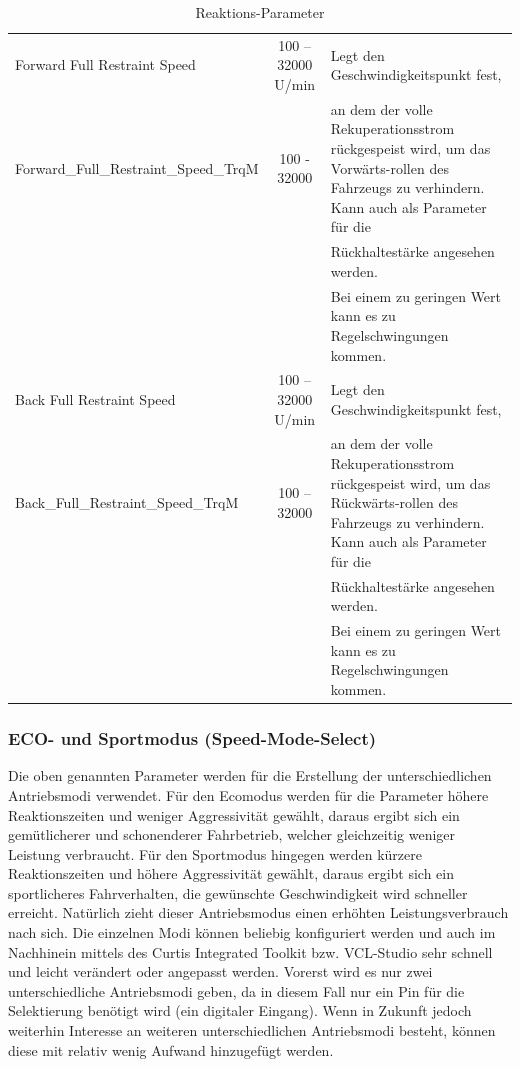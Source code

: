 \begin{table}[H]
\begin{tabular}{|lcp{6cm}|}
		Forward Full Restraint Speed & 100 – 32000 U/min & Legt den Geschwindigkeitspunkt fest,\\   Forward\_Full\_Restraint\_Speed\_TrqM & 100 - 32000 & an dem der volle Rekuperationsstrom rückgespeist wird, um das Vorwärts-rollen des Fahrzeugs zu verhindern. Kann auch als Parameter für die              \\&&Rückhaltestärke angesehen werden.\\&& Bei einem zu geringen Wert kann es zu Regelschwingungen kommen.  \\\hline
		Back Full Restraint Speed & 100 – 32000 U/min & Legt den Geschwindigkeitspunkt fest,\\ 		Back\_Full\_Restraint\_Speed\_TrqM & 100 – 32000 & an dem der volle Rekuperationsstrom rückgespeist wird, um das Rückwärts-rollen des Fahrzeugs zu verhindern. Kann auch als Parameter für die 				\\&&Rückhaltestärke angesehen werden.\\&& Bei einem zu geringen Wert kann es zu Regelschwingungen kommen. \\\hline		
	\end{tabular}	
	\caption{Reaktions-Parameter}
	\label{tab:Reaktions-Parameter}
\end{table}


\newpage

\subsubsection{ECO- und Sportmodus (Speed-Mode-Select)}
Die oben genannten Parameter werden für die Erstellung der unterschiedlichen Antriebsmodi verwendet. Für den Ecomodus werden für die Parameter höhere Reaktionszeiten und weniger Aggressivität gewählt, daraus ergibt sich ein gemütlicherer und schonenderer Fahrbetrieb, welcher gleichzeitig weniger Leistung verbraucht. Für den Sportmodus hingegen werden kürzere Reaktionszeiten und höhere Aggressivität gewählt, daraus ergibt sich ein sportlicheres Fahrverhalten, die gewünschte Geschwindigkeit wird schneller erreicht. Natürlich zieht dieser Antriebsmodus einen erhöhten Leistungsverbrauch nach sich. Die einzelnen Modi können beliebig konfiguriert werden und auch im Nachhinein mittels des Curtis Integrated Toolkit bzw. VCL-Studio sehr schnell und leicht verändert oder angepasst werden. Vorerst wird es nur zwei unterschiedliche Antriebsmodi geben, da in diesem Fall nur ein Pin für die Selektierung benötigt wird (ein digitaler Eingang). Wenn in Zukunft jedoch weiterhin Interesse an weiteren unterschiedlichen Antriebsmodi besteht, können diese mit relativ wenig Aufwand hinzugefügt werden.


